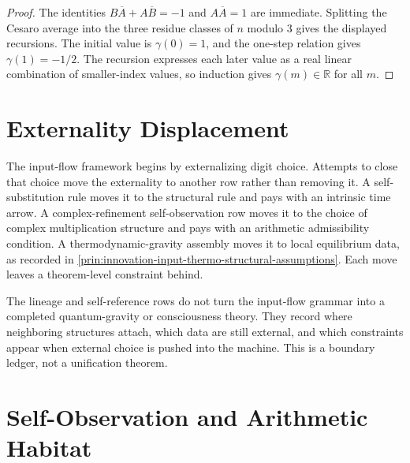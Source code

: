 \begin{proof}
The identities $B\overline A+A\overline B=-1$ and
$A\overline A=1$ are immediate. Splitting the Cesaro average into the
three residue classes of $n$ modulo $3$ gives the displayed recursions.
The initial value is $\gamma(0)=1$, and the one-step relation gives
$\gamma(1)=-1/2$. The recursion expresses each later value as a real
linear combination of smaller-index values, so induction gives
$\gamma(m)\in\mathbb R$ for all $m$.
\end{proof}

\section{Externality Displacement}
\label{sec:innovation-input-externality-displacement}

\begin{principle}
\label{prin:innovation-input-externality-displacement}
The input-flow framework begins by externalizing digit choice. Attempts to
close that choice move the externality to another row rather than removing
it. A self-substitution rule moves it to the structural rule and pays with
an intrinsic time arrow. A complex-refinement self-observation row moves it
to the choice of complex multiplication structure and pays with an
arithmetic admissibility condition. A thermodynamic-gravity assembly moves
it to local equilibrium data, as recorded in
\autoref{prin:innovation-input-thermo-structural-assumptions}. Each move
leaves a theorem-level constraint behind.
\end{principle}

\begin{principle}
\label{prin:innovation-input-no-hidden-unification-claim}
The lineage and self-reference rows do not turn the input-flow grammar into
a completed quantum-gravity or consciousness theory. They record where
neighboring structures attach, which data are still external, and which
constraints appear when external choice is pushed into the machine. This is
a boundary ledger, not a unification theorem.
\end{principle}

\section{Self-Observation and Arithmetic Habitat}
\label{sec:innovation-input-self-observation-arithmetic-habitat}


